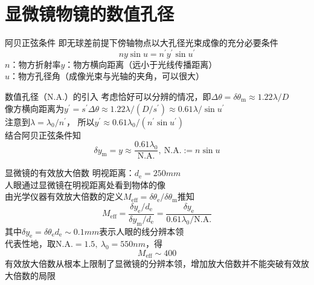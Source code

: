 \section{显微镜物镜的数值孔径}

\begin{slide}
  \begin{itemlist}
    \item{阿贝正弦条件}
      即无球差前提下傍轴物点以大孔径光束成像的充分必要条件
      $$
        \boxed{ny\sin u = n^\prime y^\prime \sin u^\prime}
      $$
      $n$：物方折射率\quad $y$：物方横向距离（远小于光线传播距离） \\
      $u$：物方孔径角（成像光束与光轴的夹角，可以很大）
    \item{数值孔径（$\mathrm{N.A.}$）的引入}
      考虑恰好可以分辨的情况，即$\Delta\theta = \delta\theta_{\mathrm m} \approx 1.22\lambda / D$ \\
      像方横向距离为$y^\prime = s^\prime\Delta\theta \approx 1.22\lambda / (D / s^\prime) \approx 0.61\lambda / \sin u^\prime$ \\
      注意到$\lambda = \lambda_0 / n^\prime$，
      所以$y^\prime \approx 0.61\lambda_0 / (n^\prime\sin u^\prime)$ \\
      结合阿贝正弦条件知
      $$
        \boxed{
          \delta y_{\mathrm m} = y \approx \frac{0.61\lambda_0}{\mathrm{N.A.}},\
          \mathrm{N.A.} := n\sin u
        }
      $$
  \end{itemlist}
\end{slide}

\begin{slide}
  \begin{itemlist}
    \item{显微镜的有效放大倍数}
      明视距离：$d_{\mathrm e} = 250\unit{mm}$ \\
      人眼通过显微镜在明视距离处看到物体的像 \\
      由光学仪器有效放大倍数的定义$M_{\mathrm{eff}} = \delta\theta_{\mathrm e} / \delta\theta_{\mathrm m}$推知
      $$
      \boxed{
        M_{\mathrm{eff}} = \frac{\delta y_{\mathrm e} / d_{\mathrm e}}{\delta y_{\mathrm m} / d_{\mathrm e}}
        = \frac{\delta y_{\mathrm e}}{0.61\lambda_0 / \mathrm{N.A.}}
      }
      $$
      其中$\delta y_{\mathrm e} = \delta\theta_{\mathrm e}d_{\mathrm e} \sim 0.1\unit{mm}$表示人眼的线分辨本领 \\
      代表性地，取$\mathrm{N.A.} = 1.5,\ \lambda_0 = 550\unit{nm}$，得
      $$\boxed{M_{\mathrm{eff}} \sim 400}$$
      有效放大倍数从根本上限制了显微镜的分辨本领，增加放大倍数并不能突破有效放大倍数的局限
  \end{itemlist}
\end{slide}

